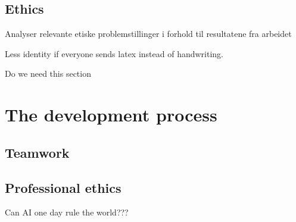 \subsection{Ethics}
Analyser relevante etiske problemstillinger i forhold til resultatene fra arbeidet

Less identity if everyone sends latex instead of handwriting.

Do we need this section

\section{The development process}
\subsection{Teamwork}

\subsection{Professional ethics}
Can AI one day rule the world???